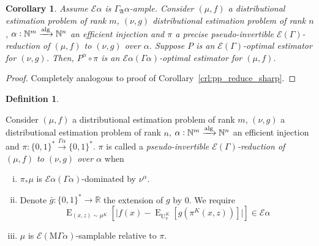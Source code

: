 \documentclass{article}
\numberwithin{equation}{section}
\theoremstyle{definition}
\newtheorem{definition}{Definition}[section]
\theoremstyle{plain}
\newtheorem{corollary}{Corollary}[section]
\newcommand{\Bool}{\{0,1\}}
\newcommand{\Words}{{\Bool^*}}
\DeclareMathOperator{\E}{E}
\DeclareMathOperator{\Un}{U}
\newcommand{\Nats}{\mathbb{N}}
\newcommand{\Reals}{\mathbb{R}}
\newcommand{\Abs}[1]{\lvert #1 \rvert}
\newcommand{\GrowA}{\Gamma_{\mathfrak{A}}}
\newcommand{\MGrow}{\mathrm{M}\Gamma}
\newcommand{\Fall}{\mathcal{E}}
\newcommand{\EG}{\Fall(\Gamma)}
\newcommand{\Alg}{\xrightarrow{\textnormal{alg}}}
\begin{document}
\begin{samepage}
\begin{corollary}

Assume ${\Fall \alpha}$ is ${\GrowA \alpha}$-ample. Consider $(\mu,f)$ a distributional estimation problem of rank ${m}$, $(\nu,g)$ distributional estimation problem of rank ${n}$, ${\alpha: \Nats^m \Alg \Nats^n}$ an efficient injection and $\pi$ a precise pseudo-invertible $\EG$-reduction of $(\mu, f)$ to $(\nu, g)$ over ${\alpha}$. Suppose $P$ is an $\EG$-optimal estimator for $(\nu, g)$. Then, $P^\alpha \circ \pi$ is an $\Fall \alpha (\Gamma \alpha)$-optimal estimator for $(\mu, f)$.

\end{corollary}
\end{samepage}

\begin{proof}

Completely analogous to proof of Corollary~\ref{crl:pp_reduce_sharp}.
%
\end{proof}

\begin{samepage}
\begin{definition}
\label{def:p_reduce}

Consider $(\mu,f)$ a distributional estimation problem of rank ${m}$, $(\nu,g)$ a distributional estimation problem of rank ${n}$, ${\alpha: \Nats^m \Alg \Nats^n}$ an efficient injection and ${\pi: \Words \xrightarrow{\Gamma \alpha} \Words}$. $\pi$ is called a \emph{pseudo-invertible $\EG$-reduction of $(\mu,f)$ to $(\nu,g)$ over ${\alpha}$} when

\begin{enumerate}[(i)]

\item\label{con:def__p_reduce__dist} ${\pi_*\mu}$ is ${\Fall \alpha(\Gamma \alpha)}$-dominated by ${\nu^\alpha}$.

\item\label{con:def__p_reduce__fun} Denote ${\bar{g}: \Words \rightarrow \Reals}$ the extension of $g$ by 0. We require \[\E_{(x,z) \sim \mu^{K}}[\Abs{f(x)-\E_{\Un_\pi^{K}}[g(\pi^{K}(x,z))]}] \in \Fall \alpha\]

\item\label{con:def__p_reduce__smp} $\mu$ is $\Fall(\MGrow \alpha)$-samplable relative to $\pi$.

\end{enumerate}

\end{definition}
\end{samepage}
\end{document}
